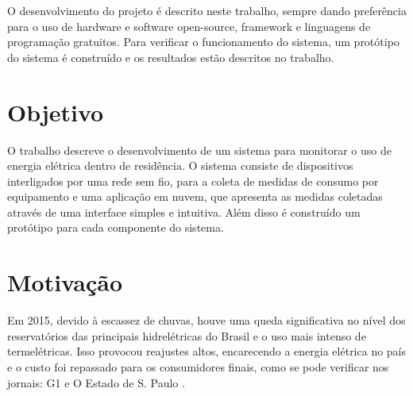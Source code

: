 O desenvolvimento do projeto é descrito neste trabalho, sempre dando preferência para o uso de hardware e software open-source, framework e linguagens de programação gratuitos. Para verificar o funcionamento do sistema, um protótipo do sistema é construído e os resultados estão descritos no trabalho.
%
\section{Objetivo}
\label{Sec:objetivo}
%
O trabalho descreve o desenvolvimento de um sistema para monitorar o uso de energia elétrica dentro de residência. O sistema consiste de dispositivos interligados por uma rede sem fio, para a coleta de medidas de consumo por equipamento e uma aplicação em nuvem, que apresenta as medidas coletadas através de uma interface simples e intuitiva. Além disso é construído um protótipo para cada componente do sistema.
%
\section{Motivação}
\label{Sec:motivacao}
%
Em 2015, devido à escassez de chuvas, houve uma queda significativa no nível dos reservatórios das principais hidrelétricas do Brasil e o uso mais intenso de termelétricas. Isso provocou reajustes altos, encarecendo a energia elétrica no país e o custo foi repassado para os consumidores finais, como se pode verificar nos jornais: G1 \cite{news_g1} e O Estado de S. Paulo \cite{news_secretaria_de_energia}.

